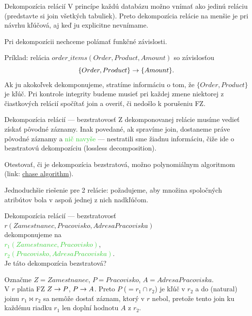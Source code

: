 \documentclass[12pt]{beamer}
\def\blue#1{\textcolor{Cerulean}{#1}}
\def\green#1{\textcolor{LimeGreen}{#1}}
\begin{document}
\begin{frame}[fragile]{Dekompozícia relácií}
V princípe každú databázu možno vnímať ako jedinú reláciu (predstavte si join všetkých tabuliek).
Preto dekompozícia relácie na menšie je pri návrhu kľúčová, aj keď ju explicitne nevnímame.
\bigskip

Pri dekompozícii \alert{nechceme polámať funkčné závislosti}.
\bigskip

Príklad: relácia $order\_items(Order, Product, Amount)$ so závislosťou
$$\{Order, Product\}\rightarrow \{Amount\}.$$
Ak ju akokoľvek dekomponujeme, stratíme informáciu o tom, že $\{Order, Product\}$ je kľúč.
Pri kontrole integrity budeme musieť pri každej zmene niektorej z čiastkových relácií spočítať join a overiť,
či nedošlo k porušeniu FZ.
\end{frame}

\begin{frame}[fragile]{Dekompozícia relácií --- bezstratovosť}
Z dekomponovanej relácie musíme vedieť získať pôvodné záznamy.
Inak povedané, ak spravíme join, dostaneme práve pôvodné záznamy a \green{nič navyše} ---
nestratili sme žiadnu informáciu, čiže ide o \alert{bezstratovú dekompozíciu} (\alert{lossless decomposition}).

\bigskip
Otestovať, či je dekompozícia bezstratová, možno polynomiálnym algoritmom
(link: \href{https://en.wikipedia.org/wiki/Chase\_(algorithm)}{chase algorithm}).

\bigskip
Jednoduchšie riešenie pre 2 relácie:
požadujeme, aby množina spoločných atribútov bola v aspoň jednej z nich nadkľúčom.
\end{frame}

\begin{frame}[fragile]{Dekompozícia relácií --- bezstratovosť}
\blue{$r(Zamestnanec, Pracovisko, AdresaPracoviska)$}\\
dekomponujeme na\\
\green{$r_1(Zamestnanec, Pracovisko)$},\\
\green{$r_2(Pracovisko, AdresaPracoviska)$}.\\
Je táto dekompozícia bezstratová?
\pause

\bigskip
Označme $Z = Zamestnanec$, $P = Pracovisko$, $A = AdresaPracoviska$.\\[2mm]
V $r$ platia FZ $Z\rightarrow P$, $P\rightarrow A$. Preto $P$ ($= r_1\cap r_2$) je kľúč v $r_2$ a do (natural) joinu $r_1\bowtie r_2$
sa nemôže dostať záznam, ktorý v $r$ nebol, pretože tento join ku každému riadku $r_1$ len doplní hodnotu $A$ z $r_2$.
\end{frame}
\end{document}

